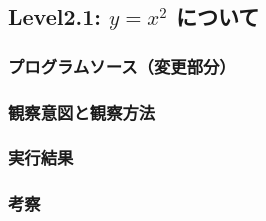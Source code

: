 \subsection{Level2.1: $y=x^2$ について}
\subsubsection{プログラムソース（変更部分）}
\subsubsection{観察意図と観察方法}
\subsubsection{実行結果}
\subsubsection{考察}

